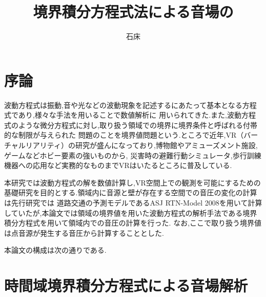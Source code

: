 \documentclass[dvipdfmx]{ampbt}
\title{境界積分方程式法による音場の}     %
      {数値解析と移動する受音点における}      %
      {リアルタイム可聴化について}                %
\author{石床}{竜一}             %
\begin{document}
\ifoutputbody
\makeinsidecover                %
\makeabstract                   %
\maketoc                        %
\setcounter{page}{1}            %
\section{序論}
波動方程式は振動,音や光などの波動現象を記述するにあたって基本となる方程式であり,様々な手法を用いることで数値解析に
用いられてきた.また,波動方程式のような微分方程式に対し,取り扱う領域での境界に境界条件と呼ばれる付帯的な制限が与えられた
問題のことを境界値問題という.ところで近年,VR（バーチャルリアリティ）の研究が盛んになっており,博物館やアミューズメント施設,ゲームなどホビー要素の強いものから,
災害時の避難行動シミュレータ\cite{vrsaigai},歩行訓練機器への応用\cite{vrmedical}など実務的なものまでVRはいたるところに普及している.\par
本研究では波動方程式の解を数値計算し,VR空間上での観測を可能にするための基礎研究を目的とする.領域内に音源と壁が存在する空間での音圧の変化の計算は先行研究\cite{vrsound}では
道路交通の予測モデルであるASJ RTN-Model 2008を用いて計算していたが,本論文では領域の境界値を用いた波動方程式の解析手法である境界積分方程式を用いて領域内での音圧の計算を行った.
なお,ここで取り扱う境界値は点音源が発生する音圧から計算することとした.\par

本論文の構成は次の通りである.

\section{時間域境界積分方程式による音場解析}
\label{2章}
\end{document}
